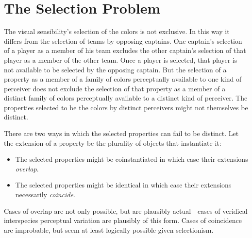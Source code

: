 \documentclass[12pt]{article}
\begin{document}
\section{The Selection Problem}\label{sec:the_selection_problem}

The visual sensibility's selection of the colors is not exclusive. In this way it differs from the selection of teams by opposing captains. One captain's selection of a player as a member of his team excludes the other captain's selection of that player as a member of the other team. Once a player is selected, that player is not available to be selected by the opposing captain. But the selection of a property as a member of a family of colors perceptually available to one kind of perceiver does not exclude the selection of that property as a member of a distinct family of colors perceptually available to a distinct kind of perceiver. The properties selected to be the colors by distinct perceivers might not themselves be distinct.

There are two ways in which the selected properties can fail to be distinct. Let the extension of a property be the plurality of objects that instantiate it: 
\begin{itemize}
	\item The selected properties might be coinstantiated in which case their extensions \emph{overlap}. 
	\item The selected properties might be identical in which case their extensions necessarily \emph{coincide}. 
\end{itemize}
Cases of overlap are not only possible, but are plausibly actual---cases of veridical interspecies perceptual variation are plausibly of this form. Cases of coincidence are improbable, but seem at least logically possible given selectionism. 
\end{document}
